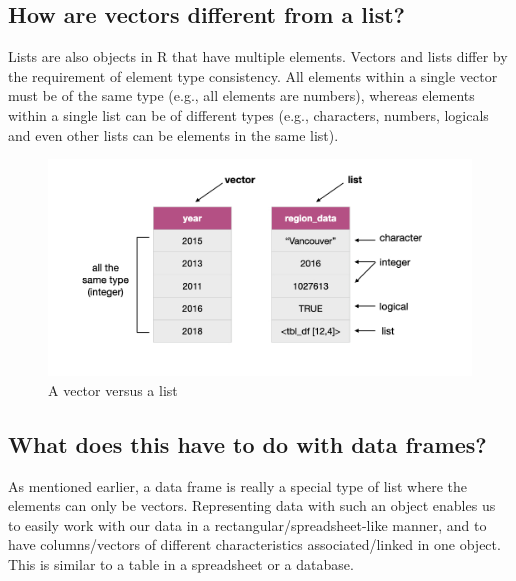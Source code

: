 \documentclass[
]{krantz}
\begin{document}
\hypertarget{how-are-vectors-different-from-a-list}{%
\subsection{How are vectors different from a list?}\label{how-are-vectors-different-from-a-list}}

Lists are also objects in R that have multiple elements. Vectors and lists differ by the requirement of element type consistency. All elements
within a single vector must be of the same type (e.g., all elements are numbers), whereas elements within a single list can be of different
types (e.g., characters, numbers, logicals and even other lists can be elements in the same list).

\begin{figure}
\includegraphics[width=1\linewidth]{img/vec_vs_list} \caption{A vector versus a list}\label{fig:02-vec-vs-list}
\end{figure}

\hypertarget{what-does-this-have-to-do-with-data-frames}{%
\subsection{What does this have to do with data frames?}\label{what-does-this-have-to-do-with-data-frames}}

As mentioned earlier, a data frame is really a special type of list where the elements can only be vectors. Representing data with such an
object enables us to easily work with our data in a rectangular/spreadsheet-like manner, and to have columns/vectors of
different characteristics associated/linked in one object. This is similar to a table in a spreadsheet or a database.
\end{document}
